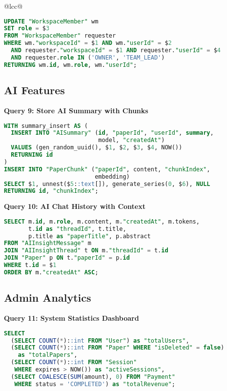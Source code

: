 \begin{itemize}
\begin{tabular}{@{}lcc@{}}
\begin{lstlisting}[language=SQL,basicstyle=\tiny\ttfamily]
UPDATE "WorkspaceMember" wm
SET role = $3
FROM "WorkspaceMember" requester
WHERE wm."workspaceId" = $1 AND wm."userId" = $2
  AND requester."workspaceId" = $1 AND requester."userId" = $4
  AND requester.role IN ('OWNER', 'TEAM_LEAD')
RETURNING wm.id, wm.role, wm."userId";
\end{lstlisting}

\subsection{AI Features}

\textbf{Query 9: Store AI Summary with Chunks}
\begin{lstlisting}[language=SQL,basicstyle=\tiny\ttfamily]
WITH summary_insert AS (
  INSERT INTO "AISummary" (id, "paperId", "userId", summary, 
                           model, "createdAt")
  VALUES (gen_random_uuid(), $1, $2, $3, $4, NOW())
  RETURNING id
)
INSERT INTO "PaperChunk" ("paperId", content, "chunkIndex", 
                          embedding)
SELECT $1, unnest($5::text[]), generate_series(0, $6), NULL
RETURNING id, "chunkIndex";
\end{lstlisting}

\textbf{Query 10: AI Chat History with Context}
\begin{lstlisting}[language=SQL,basicstyle=\tiny\ttfamily]
SELECT m.id, m.role, m.content, m."createdAt", m.tokens,
       t.id as "threadId", t.title,
       p.title as "paperTitle", p.abstract
FROM "AIInsightMessage" m
JOIN "AIInsightThread" t ON m."threadId" = t.id
JOIN "Paper" p ON t."paperId" = p.id
WHERE t.id = $1
ORDER BY m."createdAt" ASC;
\end{lstlisting}

\subsection{Admin Analytics}

\textbf{Query 11: System Statistics Dashboard}
\begin{lstlisting}[language=SQL,basicstyle=\tiny\ttfamily]
SELECT 
  (SELECT COUNT(*)::int FROM "User") as "totalUsers",
  (SELECT COUNT(*)::int FROM "Paper" WHERE "isDeleted" = false) 
    as "totalPapers",
  (SELECT COUNT(*)::int FROM "Session" 
   WHERE expires > NOW()) as "activeSessions",
  (SELECT COALESCE(SUM(amount), 0) FROM "Payment" 
   WHERE status = 'COMPLETED') as "totalRevenue";
\end{lstlisting}


\end{tabular}
\end{itemize}
